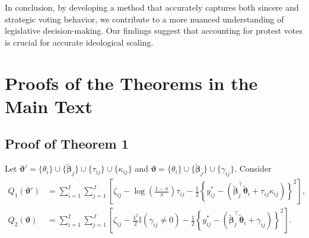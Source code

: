 \documentclass[11pt]{article}
\begin{document}
In conclusion, by developing a method that accurately captures both sincere and strategic voting behavior, we contribute to a more nuanced understanding of legislative decision-making. Our findings suggest that accounting for protest votes is crucial for accurate ideological scaling.


\clearpage




\appendix

\section{Proofs of the Theorems in the Main Text}


\subsection{Proof of Theorem 1}\label{Appen_A.1}
Let $\boldsymbol{\vartheta}' = \{\theta_i\} \cup \{\boldsymbol{\tilde{\beta}}_j\} \cup \{\tau_{ij}\} \cup \{\kappa_{ij}\}$ 
and $\boldsymbol{\vartheta} = \{\theta_i\} \cup \{\boldsymbol{\tilde{\beta}}_j\} \cup \{\gamma_{ij}\}$. Consider
\vspace{-0.7mm}
\begin{align*}
Q_1(\boldsymbol{\vartheta}')
&= \sum_{i=1}^I \sum_{j=1}^J 
\left[
\zeta_{ij} 
- \log\!\left( \frac{1-\pi}{\pi} \right) \tau_{ij}
- \frac{1}{2} \left\{ y_{ij}^* - \left( \boldsymbol{\tilde{\beta}}_j^\top \boldsymbol{\tilde{\theta}}_i 
+ \tau_{ij}\kappa_{ij} \right) \right\}^2
\right], 
\\
Q_2(\boldsymbol{\vartheta})
&= \sum_{i=1}^I \sum_{j=1}^J 
\left[
\zeta_{ij} 
- \frac{\lambda^2}{2} \mathbb{I}(\gamma_{ij}\neq 0)
- \frac{1}{2} \left\{ y_{ij}^* - \left( 
\boldsymbol{\tilde{\beta}}_j^\top \boldsymbol{\tilde{\theta}}_i 
+ \gamma_{ij} \right) \right\}^2
\right].
\end{align*}
\end{document}
